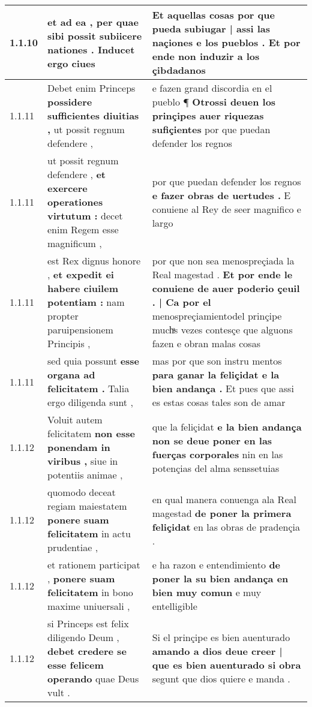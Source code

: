 \begin{tabular}{|p{1cm}|p{6.5cm}|p{6.5cm}|}
1.1.10 & et ad ea , \textbf{ per quae sibi possit subiicere nationes . } Inducet ergo ciues & Et aquellas cosas \textbf{ por que pueda subiugar | assi las naçiones e los pueblos . } Et por ende non induzir a los çibdadanos \\\hline
1.1.11 & Debet enim Princeps \textbf{ possidere sufficientes diuitias , } ut possit regnum defendere , & e fazen grand discordia en el pueblo ¶ \textbf{ Otrossi deuen los prinçipes auer riquezas sufiçientes } por que puedan defender los regnos \\\hline
1.1.11 & ut possit regnum defendere , \textbf{ et exercere operationes virtutum : } decet enim Regem esse magnificum , & por que puedan defender los regnos \textbf{ e fazer obras de uertudes . } E conuiene al Rey de seer magnifico e largo \\\hline
1.1.11 & est Rex dignus honore , \textbf{ et expedit ei habere ciuilem potentiam : } nam propter paruipensionem Principis , & por que non sea menospreçiada la Real magestad . \textbf{ Et por ende le conuiene de auer poderio çeuil . | Ca por el } menospreçiamientodel prinçipe muchͣs vezes contesçe que alguons fazen e obran malas cosas \\\hline
1.1.11 & sed quia possunt \textbf{ esse organa ad felicitatem . } Talia ergo diligenda sunt , & mas por que son instru mentos \textbf{ para ganar la feliçidat e la bien andança . } Et pues que assi es estas cosas tales son de amar \\\hline
1.1.12 & Voluit autem felicitatem \textbf{ non esse ponendam in viribus , } siue in potentiis animae , & que la feliçidat \textbf{ e la bien andança non se deue poner en las fuerças corporales } nin en las potençias del alma senssetuias \\\hline
1.1.12 & quomodo deceat regiam maiestatem \textbf{ ponere suam felicitatem } in actu prudentiae , & en qual manera conuenga ala Real magestad \textbf{ de poner la primera feliçidat } en las obras de pradençia . \\\hline
1.1.12 & et rationem participat , \textbf{ ponere suam felicitatem } in bono maxime uniuersali , & e ha razon e entendimiento \textbf{ de poner la su bien andança en bien muy comun } e muy entelligible \\\hline
1.1.12 & si Princeps est felix diligendo Deum , \textbf{ debet credere se esse felicem operando } quae Deus vult . & Si el prinçipe es bien auenturado \textbf{ amando a dios deue creer | que es bien auenturado si obra } segunt que dios quiere e manda . \\\hline

\end{tabular}
